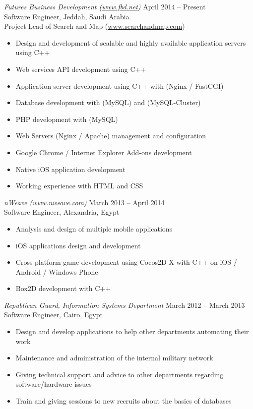 \documentclass[10pt]{res} %
\begin{document}
\begin{resume}
{\sl Futures Business Development (\href{www.fbd.net}{www.fbd.net})} \hfill April 2014 -- Present \\
Software Engineer, Jeddah, Saudi Arabia \\
Project Lead of Search and Map (\href{https://www.searchandmap.com}{www.searchandmap.com}) \\
\begin{itemize} \itemsep -2pt %
\item Design and development of scalable and highly available application servers using C++
\item Web services API development using C++ 
\item Application server development using C++ with (Nginx / FastCGI)
\item Database development with (MySQL) and (MySQL-Cluster) 
\item PHP development with (MySQL)
\item Web Servers (Nginx / Apache) management and configuration
\item Google Chrome / Internet Explorer Add-ons development
\item Native iOS application development
\item Working experience with HTML and CSS
\end{itemize}

{\sl nWeave (\href{www.nweave.com}{www.nweave.com})} \hfill March 2013 -- April 2014 \\
Software Engineer, Alexandria, Egypt \\
\begin{itemize} \itemsep -2pt %
\item Analysis and design of multiple mobile applications
\item iOS applications design and development
\item Cross-platform game development using Cocos2D-X with C++ on iOS / Android / Windows Phone
\item Box2D development with C++
\end{itemize}

{\sl Republican Guard, Information Systems Department} \hfill March 2012 -- March 2013 \\
Software Engineer, Cairo, Egypt \\
\begin{itemize} \itemsep -2pt %
\item Design and develop applications to help other departments automating their work
\item Maintenance and administration of the internal military network
\item Giving technical support and advice to other departments regarding software/hardware issues
\item Train and giving sessions to new recruits about the basics of databases   
\end{itemize}


\end{resume}
\end{document}
